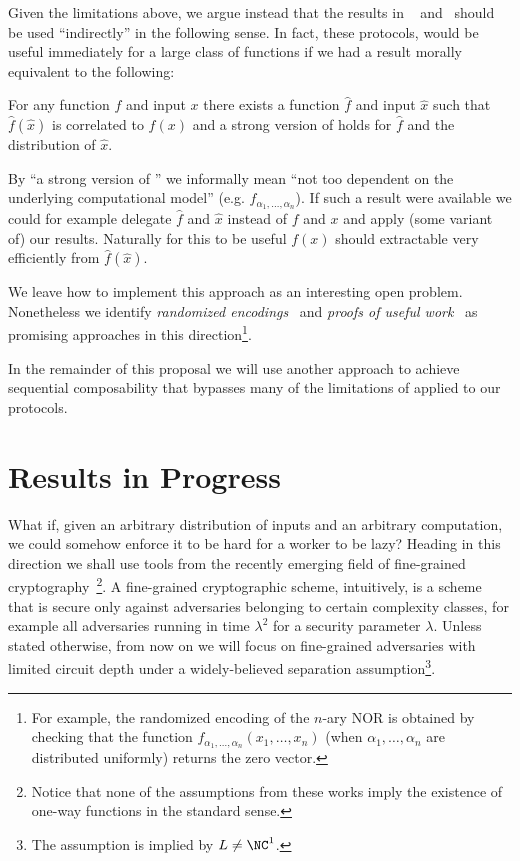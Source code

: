 {Given the limitations above, we argue instead that the results in ~\cite{cg15} and~\cite{cg17} should be used ``indirectly'' in the following sense. In fact, these protocols, would be useful immediately for a large class of functions if we had a result morally equivalent to the following:
\begin{displayquote}
For any function $f$ and input $x$ there exists a function $\hat{f}$ and input $\hat{x}$ such that  $\hat{f}(\hat{x})$ is correlated to $f(x)$ and a strong version of \NoFLAVA  holds for $\hat{f}$ and the distribution of $\hat{x}$.
\end{displayquote}
By ``a strong version of \NoFLAVA'' we informally mean ``not too dependent on the underlying computational model'' (e.g. $f_{\alpha_1,\dots,\alpha_n}$).
If such a result were available we could for example delegate $\hat{f}$ and $\hat{x}$ instead of $f$ and $x$ and apply (some variant of) our results.
Naturally for this to be useful $f(x)$ should extractable very efficiently from $\hat{f}(\hat{x})$.

We leave how to implement this approach as an interesting open problem. Nonetheless we identify \textit{randomized encodings}~\cite{re} and \textit{proofs of useful work}~\cite{ball2017proofs}
as promising approaches in this direction\footnote{For example, the randomized encoding of the $n$-ary NOR is obtained by checking that the function $f_{\alpha_1,\dots,\alpha_n}(x_1,\dots,x_n)$ (when $\alpha_1,\dots,\alpha_n$ are distributed uniformly) returns the zero vector.}.

In the remainder of this proposal we  will use another approach to achieve sequential composability that bypasses many of the limitations of \NoFLAVA applied to our protocols.

\section{Results in Progress}

What if, given an arbitrary distribution of inputs and an arbitrary computation, we could somehow enforce it to be hard for a worker to be lazy? Heading in this direction we shall use tools from the recently emerging field of fine-grained cryptography~\cite{fgcrypto}\footnote{Notice that none of the assumptions from these works imply the existence of one-way functions in the standard sense.}. A fine-grained cryptographic scheme, intuitively, is a scheme that is secure only against adversaries belonging to certain complexity classes, for example all adversaries running in time $\lambda^2$ for a security parameter $\lambda$. Unless stated otherwise, from now on we will focus on fine-grained adversaries with limited circuit depth under a widely-believed separation assumption\footnote{The assumption is implied by $L \not = \NC^1$.}.

}
